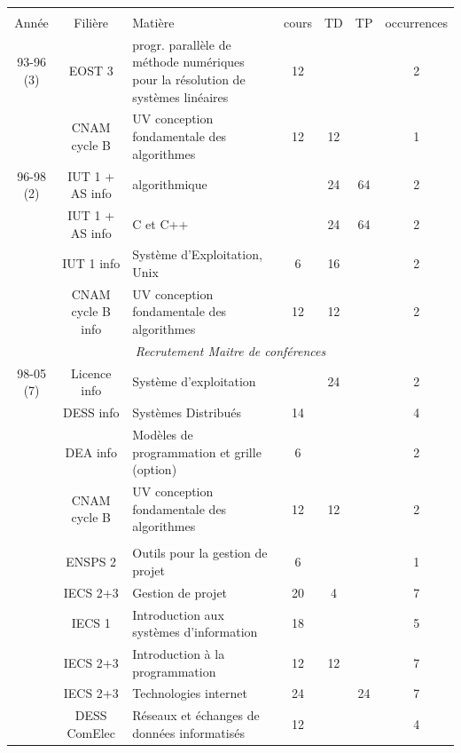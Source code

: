 \documentclass[11pt]{article}
\begin{document}
\begin{center}
{\footnotesize
\noindent \begin{tabular}{|c|c|p{5cm}|c|c|c|c|} \hline &&&&&\\[-8pt]

Année & Filière & Matière & cours & TD & TP &  occurrences \\[5pt] \hline
 93-96 (3)
      & EOST 3 & progr. parallèle de méthode numériques pour la résolution de systèmes linéaires    &12&& &2    \\
      & CNAM cycle B & UV conception fondamentale des algorithmes & 12 & 12 & 	& 1 \\

\hline
96-98 (2)
      & IUT 1 + AS info 		& algorithmique 		&    & 24 & 64   &2\\
      & IUT 1 + AS info			& C et C++ 			&    & 24 & 64   &2\\
      & IUT 1 info                	& Système d'Exploitation, Unix 	& 6  & 16 & 	 &2\\
      & CNAM cycle B info		& UV conception fondamentale des algorithmes 		& 12 & 12 & 	 &2\\

 \hline
\multicolumn{7}{|c|}{\textit{Recrutement Maitre de conférences}}\\  \hline
 98-05 (7)
      & Licence info  & Système d'exploitation 	&  	& 24 & 	& 2 \\
	& DESS info	& Systèmes Distribués		& 14	&    &	& 4 \\
	& DEA info	& Modèles de programmation et grille (option) & 6	&    &	& 2 \\
	& CNAM cycle B 		& UV conception fondamentale des algorithmes 			& 12	& 12 &	& 2 \\
&&&&&&	\\
	& ENSPS 2	& Outils pour la gestion de projet		& 6	&    &   & 1 \\
	& IECS 2+3	& Gestion de projet				&  20	& 4 &   & 7 \\
	& IECS 1	& Introduction aux systèmes d'information	& 18	&    &  & 5 \\
	& IECS 2+3	& Introduction à la programmation		& 12	& 12   &  & 7 \\
	& IECS 2+3	& Technologies internet				& 24    &    & 24 & 7 \\

	& DESS ComElec	& Réseaux et échanges de données informatisés	& 12	&    &  & 4 \\
	

\end{tabular}}
\end{center}
\end{document}
